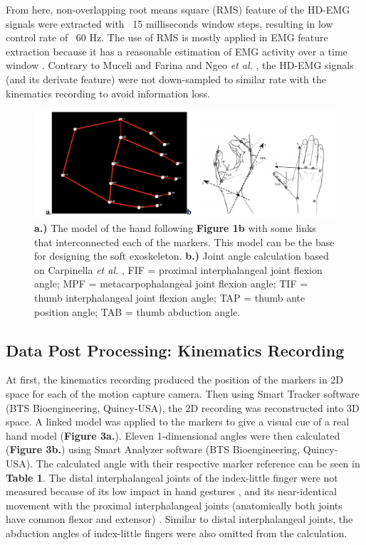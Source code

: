 \documentclass[conference]{IEEEtran}
\begin{document}
From here, non-overlapping root means square (RMS) feature of the HD-EMG signals were extracted 
with ~15 milliseconds window steps, resulting in low control rate of ~60 Hz. The use of RMS is mostly 
applied in EMG feature extraction because it has a reasonable estimation of EMG activity over a time 
window \cite{b2}\cite{b30}. Contrary to Muceli and Farina \cite{b9} and Ngeo \textit{et al.} \cite{b16}, the HD-EMG signals (and its 
derivate feature) were not down-sampled to similar rate with the kinematics recording to avoid information 
loss.

\begin{figure}[htbp]
\centerline{\includegraphics[width=\textwidth]{figure3.png}}
\caption{ \textbf{a.)} The model of the hand following \textbf{Figure 1b} with some links that interconnected each of 
the markers. This model can be the base for designing the soft exoskeleton. \textbf{b.)} Joint angle calculation 
based on Carpinella \textit{et al.} \cite{b25}, FIF = proximal interphalangeal joint flexion angle; MPF = 
metacarpophalangeal joint flexion angle; TIF = thumb interphalangeal joint flexion angle; TAP = 
thumb ante position angle; TAB = thumb abduction angle.}
\label{figure3}
\end{figure}

\subsection{Data Post Processing: Kinematics Recording}
At first, the kinematics recording produced the position of the markers in 2D space for each of the 
motion capture camera. Then using Smart Tracker software (BTS Bioengineering, Quincy-USA), the 2D 
recording was reconstructed into 3D space. A linked model was applied to the markers to give a visual cue 
of a real hand model (\textbf{Figure 3a.}). Eleven 1-dimensional angles were then calculated (\textbf{Figure 3b.}) using 
Smart Analyzer software (BTS Bioengineering, Quincy-USA). The calculated angle with their respective 
marker reference can be seen in \textbf{Table 1}. The distal interphalangeal joints of the index-little finger were not 
measured because of its low impact in hand gestures \cite{b31}, and its near-identical movement with the proximal 
interphalangeal joints (anatomically both joints have common flexor and extensor) \cite{b16}. Similar to distal 
interphalangeal joints, the abduction angles of index-little fingers were also omitted from the calculation.
\end{document}
